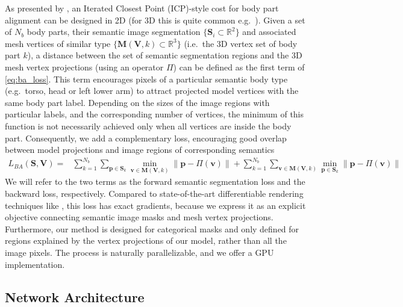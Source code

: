 \documentclass[runningheads]{llncs}
\newcommand{\vb}{\mathbf{v}}
\newcommand{\eg}{e.g.\ }
\newcommand{\ie}{i.e.\ }
\newcommand{\Sb}{\mathbf{S}}
\newcommand{\Vb}{\mathbf{V}}
\begin{document}
As presented by \cite{zanfir2018monocular}, an Iterated Closest Point (ICP)-style cost for body part alignment can be designed in 2D (for 3D this is quite common \eg  \cite{zhang2017detailed}). Given a set of $N_b$ body parts, their semantic image segmentation $\{\Sb_i \subset \mathbb{R}^2\}$ and associated mesh vertices of similar type $\{\mathbf{M}(\Vb, k) \subset \mathbb{R}^3\}$ (\ie the 3D vertex set of body part $k$), a distance between the set of semantic segmentation regions and the 3D mesh vertex projections (using an operator $\Pi$) can be defined as the first term of \eqref{eq:ba_loss}.
This term encourages pixels of a particular semantic body type (\eg torso, head or left lower arm) to attract projected model vertices with the same body part label. Depending on the sizes of the image regions with particular labels, and the corresponding number of vertices, the minimum of this function is not necessarily achieved only when all vertices are inside the body part. Consequently, we add a complementary loss, encouraging good overlap between  model projections and image regions of corresponding semantics 
\begin{align}
    L_{BA}(\Sb, \Vb) =& \sum_{k=1}^{N_b} \sum_{\mathbf{p} \in \mathbf{S}_k} \min_{\vb \in \mathbf{M}(\mathbf{V},k)} \left\lVert \mathbf{p} - \Pi(\vb)\right\rVert + 
\sum_{k=1}^{N_b}\sum_{\vb \in \mathbf{M}(\mathbf{V},k)} \min_{\mathbf{p} \in \Sb_k} \lVert \mathbf{p} - \Pi(\vb)\rVert \label{eq:ba_loss}
\end{align}
We will refer to the two terms as the forward semantic segmentation loss and the backward loss, respectively. Compared to state-of-the-art differentiable rendering techniques like \cite{kato2018neural}, this loss has exact gradients, because we express it as an explicit objective connecting semantic image masks and mesh vertex projections. Furthermore, our method is designed for categorical masks and only defined for regions explained by the vertex projections of our model, rather than all the image pixels.
The process is naturally parallelizable, and we offer a GPU implementation.

\subsection{Network Architecture}
\end{document}
